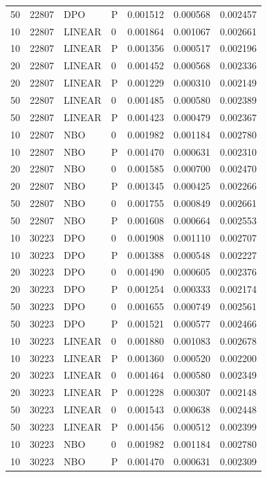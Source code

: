 \begin{longtable}{rrllrrr}
50 & 22807 & DPO & P & 0.001512 & 0.000568 & 0.002457\\
10 & 22807 & LINEAR & 0 & 0.001864 & 0.001067 & 0.002661\\
10 & 22807 & LINEAR & P & 0.001356 & 0.000517 & 0.002196\\
20 & 22807 & LINEAR & 0 & 0.001452 & 0.000568 & 0.002336\\
20 & 22807 & LINEAR & P & 0.001229 & 0.000310 & 0.002149\\
50 & 22807 & LINEAR & 0 & 0.001485 & 0.000580 & 0.002389\\
50 & 22807 & LINEAR & P & 0.001423 & 0.000479 & 0.002367\\
10 & 22807 & NBO & 0 & 0.001982 & 0.001184 & 0.002780\\
10 & 22807 & NBO & P & 0.001470 & 0.000631 & 0.002310\\
20 & 22807 & NBO & 0 & 0.001585 & 0.000700 & 0.002470\\
20 & 22807 & NBO & P & 0.001345 & 0.000425 & 0.002266\\
50 & 22807 & NBO & 0 & 0.001755 & 0.000849 & 0.002661\\
50 & 22807 & NBO & P & 0.001608 & 0.000664 & 0.002553\\
10 & 30223 & DPO & 0 & 0.001908 & 0.001110 & 0.002707\\
10 & 30223 & DPO & P & 0.001388 & 0.000548 & 0.002227\\
20 & 30223 & DPO & 0 & 0.001490 & 0.000605 & 0.002376\\
20 & 30223 & DPO & P & 0.001254 & 0.000333 & 0.002174\\
50 & 30223 & DPO & 0 & 0.001655 & 0.000749 & 0.002561\\
50 & 30223 & DPO & P & 0.001521 & 0.000577 & 0.002466\\
10 & 30223 & LINEAR & 0 & 0.001880 & 0.001083 & 0.002678\\
10 & 30223 & LINEAR & P & 0.001360 & 0.000520 & 0.002200\\
20 & 30223 & LINEAR & 0 & 0.001464 & 0.000580 & 0.002349\\
20 & 30223 & LINEAR & P & 0.001228 & 0.000307 & 0.002148\\
50 & 30223 & LINEAR & 0 & 0.001543 & 0.000638 & 0.002448\\
50 & 30223 & LINEAR & P & 0.001456 & 0.000512 & 0.002399\\
10 & 30223 & NBO & 0 & 0.001982 & 0.001184 & 0.002780\\
10 & 30223 & NBO & P & 0.001470 & 0.000631 & 0.002309\\

\end{longtable}
